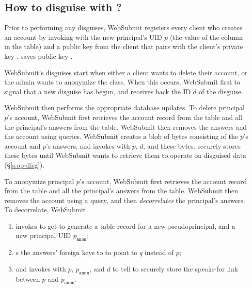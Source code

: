 \subsection{How to disguise with \sys?}

Prior to performing any disguises, WebSubmit registers every client who creates an account by
invoking  with the new principal's UID $p$ (the value of the  column in
the  table) and a public key  from the client that pairs with the client's private
key .  \sys saves public key .

WebSubmit's disguises start when either a client wants to delete their account, or the admin wants
to anonymize the class.
When this occurs, WebSubmit first  to signal \sys that a new disguise has begun,
and receives back the ID $d$ of the disguise.

WebSubmit then performs the appropriate database updates.  To delete principal $p$'s account,
WebSubmit first retrieves the account record from the  table and all the principal's
answers from the  table. WebSubmit then removes the answers and the account using
 queries.  WebSubmit creates a blob of bytes consisting of the $p$'s account and $p$'s
answers, and invokes  with $p$, $d$, and these bytes. \sys securely stores
these bytes until WebSubmit wants to retrieve them to operate on disguised data (\S\ref{s:op-disg}).

To anonymize principal $p$'s account, WebSubmit first retrieves the account record from the 
table and all the principal's answers from the  table. WebSubmit then removes the
account using a  query, and then \emph{decorrelates} the principal's answers.
To decorrelate, WebSubmit
\begin{enumerate}
%
\item invokes  to get \sys to generate a  table record for a new
    pseudoprincipal, and a new principal UID $p_{\texttt{anon}}$;
%
\item {}s the answers' foreign keys to  to point to $q$ instead of $p$;
%
\item and invokes  with $p$, $p_{\texttt{anon}}$, and $d$ to tell
    \sys to securely store the speaks-for link between $p$ and $p_{\texttt{anon}}$.
\end{enumerate}

